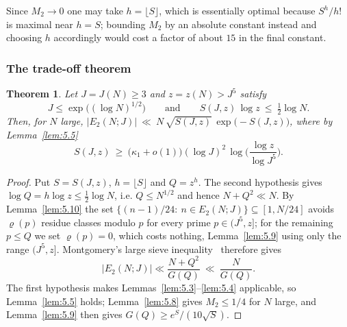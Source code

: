 \documentclass[11pt, a4paper]{article}
\theoremstyle{plain}
\newtheorem{theorem}{Theorem}[section]
\theoremstyle{definition}
\begin{document}
Since $M_2\to0$ one may take $h=\lfloor S\rfloor$, which is essentially optimal because $S^{h}/h!$ is maximal near $h=S$; bounding $M_2$ by an absolute constant instead and choosing $h$ accordingly would cost a factor of about $15$ in the final constant.

\subsubsection{The trade-off theorem} \label{sec:5.2.6}

\begin{theorem}\label{thm:tradeoff}
Let $J=J(N)\ge3$ and $z=z(N)>J^{5}$ satisfy
\begin{equation}\label{eq:tradeoff_hyp}
J\le\exp\big((\log N)^{1/2}\big)\qquad\text{and}\qquad S(J,z)\,\log z\ \le\ \tfrac12\log N .
\end{equation}
Then, for $N$ large, $|E_2(N;J)|\ \ll\ N\,\sqrt{S(J,z)}\,\exp\big(-S(J,z)\big)$, where by Lemma~\ref{lem:5.5}
$$S(J,z)\ \ge\ \big(\kappa_1+o(1)\big)(\log J)^{2}\,\log\!\Big(\frac{\log z}{\log J^{5}}\Big).$$
\end{theorem}
\begin{proof}
Put $S=S(J,z)$, $h=\lfloor S\rfloor$ and $Q=z^{h}$. The second hypothesis gives $\log Q=h\log z\le\frac12\log N$, i.e. $Q\le N^{1/2}$ and hence $N+Q^{2}\ll N$. By Lemma~\ref{lem:5.10} the set $\{(n-1)/24:\ n\in E_2(N;J)\}\subseteq[1,N/24]$ avoids $\varrho(p)$ residue classes modulo $p$ for every prime $p\in(J^{5},z]$; for the remaining $p\le Q$ we set $\varrho(p)=0$, which costs nothing, Lemma~\ref{lem:5.9} using only the range $(J^{5},z]$. Montgomery's large sieve inequality~\cite{montgomery1971} therefore gives
\begin{equation} \label{eq:large_sieve_bound}
|E_2(N;J)| \ll \frac{N + Q^2}{G(Q)}\ \ll\ \frac{N}{G(Q)} .
\end{equation}
The first hypothesis makes Lemmas~\ref{lem:5.3}--\ref{lem:5.4} applicable, so Lemma~\ref{lem:5.5} holds; Lemma~\ref{lem:5.8} gives $M_2\le1/4$ for $N$ large, and Lemma~\ref{lem:5.9} then gives $G(Q)\ge e^{S}/(10\sqrt S)$.
\end{proof}
\end{document}
